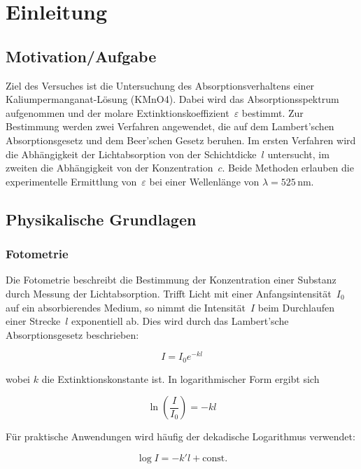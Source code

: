 \chapter{Einleitung}
\label{ch:einleitung}

\section{Motivation/Aufgabe}
Ziel des Versuches ist die Untersuchung des Absorptionsverhaltens einer Kaliumpermanganat-Lösung ({KMnO4}). Dabei wird das Absorptionsspektrum aufgenommen und der molare Extinktionskoeffizient~$\varepsilon$ bestimmt. Zur Bestimmung werden zwei Verfahren angewendet, die auf dem Lambert'schen Absorptionsgesetz und dem Beer'schen Gesetz beruhen. Im ersten Verfahren wird die Abhängigkeit der Lichtabsorption von der Schichtdicke~$l$ untersucht, im zweiten die Abhängigkeit von der Konzentration~$c$. Beide Methoden erlauben die experimentelle Ermittlung von~$\varepsilon$ bei einer Wellenlänge von $\lambda = 525\,\text{nm}$.

\section{Physikalische Grundlagen}
\subsection*{Fotometrie}
Die Fotometrie beschreibt die Bestimmung der Konzentration einer Substanz durch Messung der Lichtabsorption. Trifft Licht mit einer Anfangsintensität~$I_0$ auf ein absorbierendes Medium, so nimmt die Intensität~$I$ beim Durchlaufen einer Strecke~$l$ exponentiell ab. Dies wird durch das Lambert'sche Absorptionsgesetz beschrieben:

\begin{equation}
    I = I_0 e^{-kl}
    \label{eq:lambert}
\end{equation}

wobei $k$ die Extinktionskonstante ist. In logarithmischer Form ergibt sich

\begin{equation}
    \ln \left(\frac{I}{I_0}\right) = -kl
    \label{eq:lambert_log}
\end{equation}

Für praktische Anwendungen wird häufig der dekadische Logarithmus verwendet:

\begin{equation}
    \log I = -k'l + \text{const.}
    \label{eq:bunsen}
\end{equation}

